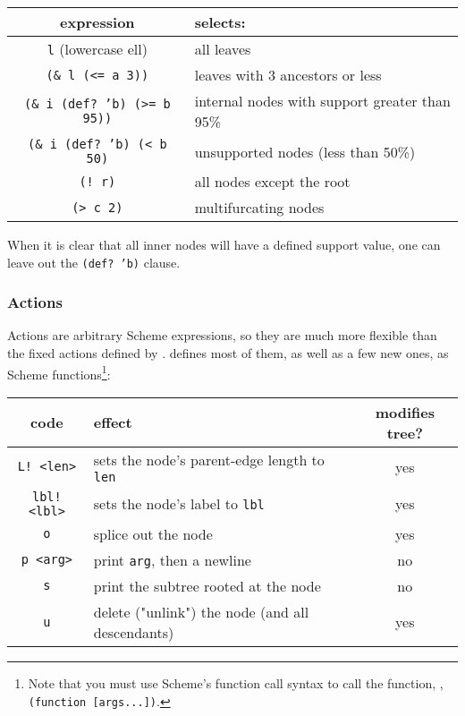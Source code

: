 \begin{center}
\begin{tabular}{cl}
expression & selects: \\
\hline
\texttt{l} (lowercase ell) & all leaves \\
\texttt{(\& l (<= a 3))} & leaves with 3 ancestors or less \\
\texttt{(\& i (def? 'b) (>= b 95))} & internal nodes with support greater than 95\% \\ 
\texttt{(\& i (def? 'b) (< b 50)} & unsupported nodes (less than 50\%) \\
\texttt{(! r)} & all nodes except the root \\
\texttt{(> c 2)} & multifurcating nodes
\end{tabular}
\end{center}

\noindent{}When it is clear that all inner nodes will have a defined support
value, one can leave out the \texttt{(def? 'b)} clause.

\subsubsection{Actions}

Actions are arbitrary Scheme expressions, so they are much more flexible than
the fixed actions defined by \ed. \sched{} defines most of them, as well as a
few new ones, as Scheme functions\footnote{Note that you must use Scheme's function call syntax to call the function, \ie, \texttt{(function [args...])}.}:

\begin{center}
\begin{tabular}{clc}
code & effect & modifies tree?\\
\hline
\texttt{L! <len>}	& sets the node's parent-edge length to \texttt{len}	& yes \\
\texttt{lbl! <lbl>}	& sets the node's label to \texttt{lbl}	& yes \\
\texttt{o} 				& splice out the node 									& yes \\
\texttt{p <arg>} 	& print \texttt{arg}, then a newline 		& no \\
\texttt{s} 				& print the subtree rooted at the node 	& no \\
\texttt{u} 				& delete ("unlink") the node (and all descendants) & yes \\
\end{tabular}
\end{center}

